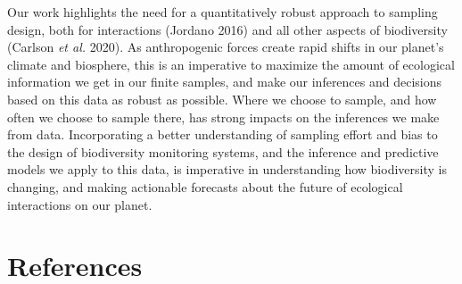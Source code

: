 \documentclass[11pt]{article}
\begin{document}
Our work highlights the need for a quantitatively robust approach to
sampling design, both for interactions (Jordano 2016) and all other
aspects of biodiversity (Carlson \emph{et al.} 2020). As anthropogenic
forces create rapid shifts in our planet's climate and biosphere, this
is an imperative to maximize the amount of ecological information we get
in our finite samples, and make our inferences and decisions based on
this data as robust as possible. Where we choose to sample, and how
often we choose to sample there, has strong impacts on the inferences we
make from data. Incorporating a better understanding of sampling effort
and bias to the design of biodiversity monitoring systems, and the
inference and predictive models we apply to this data, is imperative in
understanding how biodiversity is changing, and making actionable
forecasts about the future of ecological interactions on our planet.

\hypertarget{references}{%
\section*{References}\label{references}}
\end{document}
